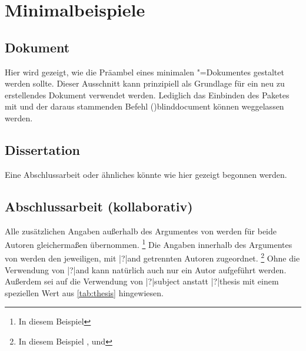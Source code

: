 \chapter{%
  Minimalbeispiele%
  \label{sec:exmpl}%
}
\section{%
  Dokument%
}

Hier wird gezeigt, wie die Präambel eines minimalen "=Dokumentes 
gestaltet werden sollte. Dieser Ausschnitt kann prinzipiell als Grundlage für 
ein neu zu erstellendes Dokument verwendet werden. Lediglich das Einbinden des 
Paketes  mit  und 
der daraus stammenden Befehl \Macro*(){blinddocument} können 
weggelassen werden.



\section{%
  Dissertation%
  \label{sec:exmpl:dissertation}%
}

Eine Abschlussarbeit oder ähnliches könnte wie hier gezeigt begonnen werden.



\section{%
  Abschlussarbeit (kollaborativ)%
  \label{sec:exmpl:thesis}%
}

Alle zusätzlichen Angaben außerhalb des Argumentes von  werden 
für beide Autoren gleichermaßen übernommen.%
\footnote{In diesem Beispiel }
Die Angaben innerhalb des Argumentes von  werden den jeweiligen, 
mit \Macro|?|{and} getrennten Autoren zugeordnet.%
\footnote{%
  In diesem Beispiel ,  und 
}
Ohne die Verwendung von \Macro|?|{and} kann natürlich auch nur ein Autor 
aufgeführt werden. Außerdem sei auf die Verwendung von \Macro|?|{subject} 
anstatt \Macro|?|{thesis} mit einem speziellen Wert aus \autoref{tab:thesis} 
hingewiesen.



